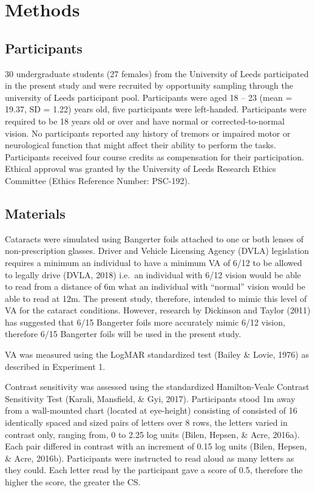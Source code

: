 \documentclass[
  english,
  man,floatsintext]{apa6}
\begin{document}
\hypertarget{methods-1}{%
\section{Methods}\label{methods-1}}

\hypertarget{participants-1}{%
\subsection{Participants}\label{participants-1}}

30 undergraduate students (27 females) from the University of Leeds participated in the present study and were recruited by opportunity sampling through the university of Leeds participant pool.
Participants were aged 18 -- 23 (mean = 19.37, SD = 1.22) years old, five participants were left-handed.
Participants were required to be 18 years old or over and have normal or corrected-to-normal vision.
No participants reported any history of tremors or impaired motor or neurological function that might affect their ability to perform the tasks.
Participants received four course credits as compensation for their participation.
Ethical approval was granted by the University of Leeds Research Ethics Committee (Ethics Reference Number: PSC-192).

\hypertarget{materials-1}{%
\subsection{Materials}\label{materials-1}}

Cataracts were simulated using Bangerter foils attached to one or both lenses of non-prescription glasses. Driver and Vehicle Licensing Agency (DVLA) legislation requires a minimum an individual to have a minimum VA of 6/12 to be allowed to legally drive (DVLA, 2018) i.e.~an individual with 6/12 vision would be able to read from a distance of 6m what an individual with \enquote{normal} vision would be able to read at 12m. The present study, therefore, intended to mimic this level of VA for the cataract conditions. However, research by Dickinson and Taylor (2011) has suggested that 6/15 Bangerter foils more accurately mimic 6/12 vision, therefore 6/15 Bangerter foils will be used in the present study.

VA was measured using the LogMAR standardized test (Bailey \& Lovie, 1976) as described in Experiment 1.

Contrast sensitivity was assessed using the standardized Hamilton-Veale Contrast Sensitivity Test (Karali, Mansfield, \& Gyi, 2017).
Participants stood 1m away from a wall-mounted chart (located at eye-height) consisting of consisted of 16 identically spaced and sized pairs of letters over 8 rows, the letters varied in contrast only, ranging from, 0 to 2.25 log units (Bilen, Hepsen, \& Acre, 2016a).
Each pair differed in contrast with an increment of 0.15 log units (Bilen, Hepsen, \& Acre, 2016b).
Participants were instructed to read aloud as many letters as they could.
Each letter read by the participant gave a score of 0.5, therefore the higher the score, the greater the CS.
\end{document}

